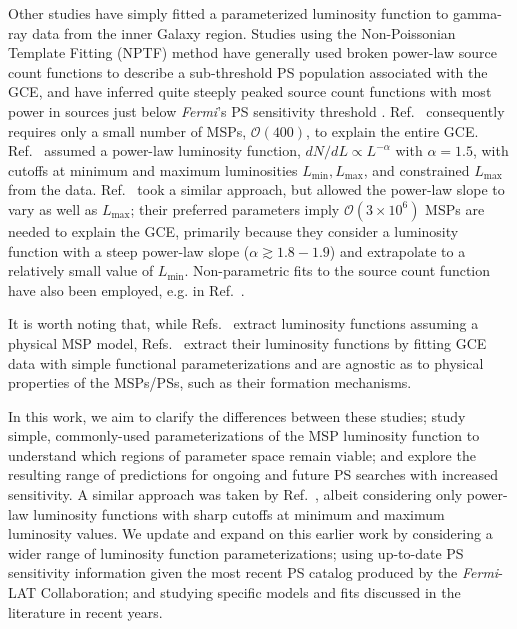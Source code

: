 \documentclass[letter,11pt]{article}
\begin{document}
Other studies have simply fitted a parameterized luminosity function to gamma-ray data from the inner Galaxy region. Studies using the Non-Poissonian Template Fitting (NPTF) method \cite{Lee:2015fea, Mishra-Sharma:2016gis} have generally used broken power-law source count functions to describe a sub-threshold PS population associated with the GCE, and have inferred quite steeply peaked source count functions with most power in sources just below \textit{Fermi}'s PS sensitivity threshold \cite{Lee:2015fea, Buschmann:2020adf}. Ref.~\cite{Lee:2015fea} consequently requires only a small number of MSPs, $\mathcal{O}(400)$, to explain the entire GCE. Ref.~\cite{Bartels:2015aea} assumed a power-law luminosity function, $dN/dL \propto L^{-\alpha}$ with $\alpha=1.5$, with cutoffs at minimum and maximum luminosities $L_\text{min}, L_\text{max}$, and constrained $L_\text{max}$ from the data. Ref.~\cite{Zhong:2019ycb} took a similar approach, but allowed the power-law slope to vary as well as $L_\text{max}$; their preferred parameters imply $\mathcal{O}(3\times 10^6)$ MSPs are needed to explain the GCE, primarily because they consider a luminosity function with a steep power-law slope ($\alpha \gtrsim 1.8-1.9$) and extrapolate to a relatively small value of $L_\text{min}$. Non-parametric fits to the source count function have also been employed, e.g. in Ref.~\cite{List:2021aer}.

It is worth noting that, while Refs.~\cite{Bartels:2018xom,Gautam:2021wqn,Hooper16,Ploeg:2020jeh} extract luminosity functions assuming a physical MSP model, Refs.~\cite{Zhong:2019ycb, Bartels:2015aea,Lee:2015fea} extract their luminosity functions by fitting GCE data with simple functional parameterizations and are agnostic as to physical properties of the MSPs/PSs, such as their formation mechanisms.

In this work, we aim to clarify the differences between these studies; study simple, commonly-used parameterizations of the MSP luminosity function to understand which regions of parameter space remain viable; and explore the resulting range of predictions for ongoing and future PS searches with increased sensitivity. A similar approach was taken by Ref.~\cite{Petrovic:2014xra}, albeit considering only power-law luminosity functions with sharp cutoffs at minimum and maximum luminosity values. We update and expand on this earlier work by considering a wider range of luminosity function parameterizations; using up-to-date PS sensitivity information given the most recent PS catalog produced by the {\it Fermi}-LAT Collaboration; and studying specific models and fits discussed in the literature in recent years.
\end{document}
